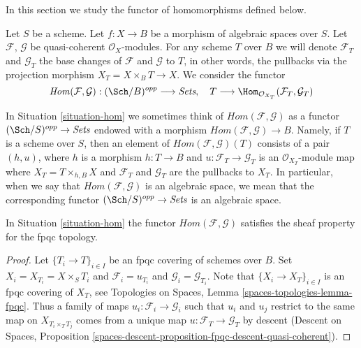 \noindent
In this section we study the functor of homomorphisms defined below.

\begin{situation}
\label{situation-hom}
Let $S$ be a scheme. Let $f : X \to B$ be a morphism of algebraic spaces
over $S$. Let $\mathcal{F}$, $\mathcal{G}$ be quasi-coherent
$\mathcal{O}_X$-modules. For any scheme $T$ over $B$ we will denote
$\mathcal{F}_T$ and $\mathcal{G}_T$ the base changes of
$\mathcal{F}$ and $\mathcal{G}$ to $T$, in other words, the pullbacks
via the projection morphism $X_T = X \times_B T \to X$.
We consider the functor
\begin{equation}
\label{equation-hom}
\mathit{Hom}(\mathcal{F}, \mathcal{G}) :
(\Sch/B)^{opp}
\longrightarrow
\textit{Sets},\quad
T
\longrightarrow
\Hom_{\mathcal{O}_{X_T}}(\mathcal{F}_T, \mathcal{G}_T)
\end{equation}
\end{situation}

\noindent
In Situation \ref{situation-hom} we sometimes think of
$\mathit{Hom}(\mathcal{F}, \mathcal{G})$ as a functor
$(\Sch/S)^{opp} \to \textit{Sets}$
endowed with a morphism
$\mathit{Hom}(\mathcal{F}, \mathcal{G}) \to B$.
Namely, if $T$ is a scheme over $S$, then an element of
$\mathit{Hom}(\mathcal{F}, \mathcal{G})(T)$ consists of a pair
$(h, u)$, where $h$ is a morphism $h : T \to B$ and
$u : \mathcal{F}_T \to \mathcal{G}_T$ is an $\mathcal{O}_{X_T}$-module
map where $X_T = T \times_{h, B} X$ and $\mathcal{F}_T$ and $\mathcal{G}_T$
are the pullbacks to $X_T$. In particular, when we say
that $\mathit{Hom}(\mathcal{F}, \mathcal{G})$ is an algebraic space,
we mean that the corresponding functor
$(\Sch/S)^{opp} \to \textit{Sets}$ is an algebraic space.

\begin{lemma}
\label{lemma-hom-sheaf}
In Situation \ref{situation-hom} the functor
$\mathit{Hom}(\mathcal{F}, \mathcal{G})$ 
satisfies the sheaf property for the fpqc topology.
\end{lemma}

\begin{proof}
Let $\{T_i \to T\}_{i \in I}$ be an fpqc covering of schemes over $B$.
Set $X_i = X_{T_i} = X \times_S T_i$ and $\mathcal{F}_i = u_{T_i}$
and $\mathcal{G}_i = \mathcal{G}_{T_i}$.
Note that $\{X_i \to X_T\}_{i \in I}$ is an fpqc covering of $X_T$, see
Topologies on Spaces, Lemma \ref{spaces-topologies-lemma-fpqc}.
Thus a family of maps $u_i : \mathcal{F}_i \to \mathcal{G}_i$
such that $u_i$ and $u_j$ restrict to the same map on
$X_{T_i \times_T T_j}$ comes from a unique map
$u : \mathcal{F}_T \to \mathcal{G}_T$ by descent
(Descent on Spaces, Proposition
\ref{spaces-descent-proposition-fpqc-descent-quasi-coherent}).
\end{proof}

